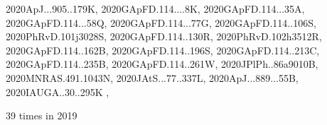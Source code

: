 \documentclass[12pt]{article}
\begin{document}
\begin{description}
{2020ApJ...905..179K,%
2020GApFD.114....8K,%
2020GApFD.114...35A,%
2020GApFD.114...58Q,%
2020GApFD.114...77G,%
2020GApFD.114..106S,%
2020PhRvD.101j3028S,%
2020GApFD.114..130R,%
2020PhRvD.102h3512R,%
2020GApFD.114..162B,%
2020GApFD.114..196S,%
2020GApFD.114..213C,%
2020GApFD.114..235B,%
2020GApFD.114..261W,%
2020JPlPh..86a9010B,%
2020MNRAS.491.1043N,%
2020JAtS...77..337L,%
2020ApJ...889...55B,%
2020IAUGA..30..295K%
},\item
\item %
39 times in 2019 \citep{
Peng2019HelicityHT,%
2019arXiv190808781E,%
2020ApJ...898..112P,%
2019ApJ...872..132P,%
2019arXiv190204172R,%
}
\end{description}
\end{document}
